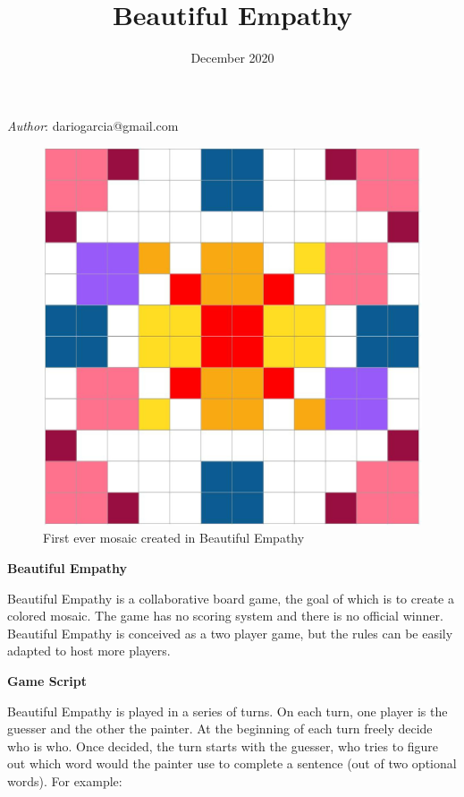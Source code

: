 \documentclass{article}
\title{Beautiful Empathy}
\date{December 2020}
\newcommand{\lvl}[1]{\vspace{0.5cm}\Large{\textbf{#1}}\vspace{0.2cm}}
\begin{document}
\maketitle

\textit{Author}: dariogarcia@gmail.com

\begin{figure}[h!]
\centering
\includegraphics[scale=0.2]{First_ever.jpg}
\caption{First ever mosaic created in Beautiful Empathy}
\label{fig:mosaic}
\end{figure}


\lvl{Beautiful Empathy}

Beautiful Empathy is a collaborative board game, the goal of which is to create a colored mosaic. The game has no scoring system and there is no official winner. Beautiful Empathy is conceived as a two player game, but the rules can be easily adapted to host more players. 


\lvl{Game Script}

Beautiful Empathy is played in a series of turns. On each turn, one player is the guesser and the other the painter. At the beginning of each turn freely decide who is who. Once decided, the turn starts with the guesser, who tries to figure out which word would the painter use to complete a sentence (out of two optional words). For example:
\end{document}
